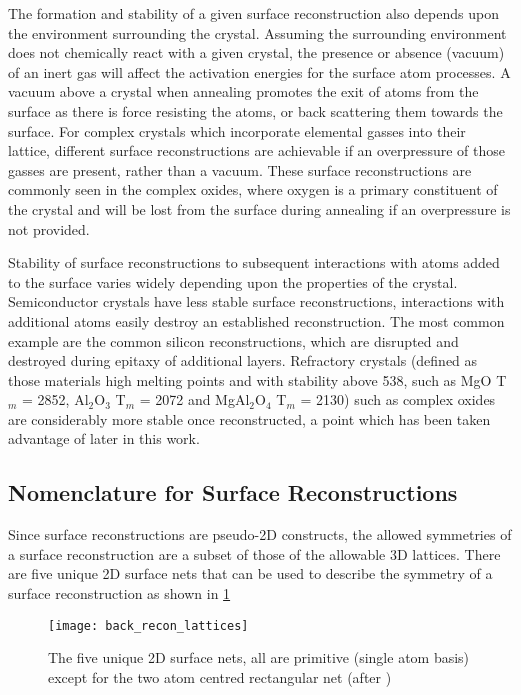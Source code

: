 The formation and stability of a given surface reconstruction also depends upon the environment surrounding the crystal. Assuming the surrounding environment does not chemically react with a given crystal, the presence or absence (vacuum) of an inert gas will affect the activation energies for the surface atom processes. A vacuum above a crystal when annealing promotes the exit of atoms from the surface as there is force resisting the atoms, or back scattering them towards the surface. For complex crystals which incorporate elemental gasses into their lattice, different surface reconstructions are achievable if an overpressure of those gasses are present, rather than a vacuum. These surface reconstructions are commonly seen in the complex oxides, where oxygen is a primary constituent of the crystal and will be lost from the surface during annealing if an overpressure is not provided.

Stability of surface reconstructions to subsequent interactions with atoms added to the surface varies widely depending upon the properties of the crystal. Semiconductor crystals have less stable surface reconstructions, interactions with additional atoms easily destroy an established reconstruction. The most common example are the common silicon reconstructions, which are disrupted and destroyed during epitaxy of additional layers. Refractory crystals (defined as those materials high melting points and with stability above 538\celsius{}\cite{ASTMC71}, such as MgO T$_m$ = 2852\celsius{}, Al$_2$O$_3$ T$_m$ = 2072\celsius{} and MgAl$_2$O$_4$ T$_m$ = 2130\celsius{}) such as complex oxides are considerably more stable once reconstructed, a point which has been taken advantage of later in this work.

\subsection{Nomenclature for Surface Reconstructions}
Since surface reconstructions are pseudo-2D constructs, the allowed symmetries of a surface reconstruction are a subset of those of the allowable 3D lattices. There are five unique 2D surface nets that can be used to describe the symmetry of a surface reconstruction as shown in \cref{fig:back_recon_lattices}
\begin{figure}
    \centering
    \texttt{[image: back\_recon\_lattices]}
    \caption[2D Surface Nets]{\label{fig:back_recon_lattices}The five unique 2D surface nets, all are primitive (single atom basis) except for the two atom centred rectangular net (after \cite{ohring2001materials})}
\end{figure}

